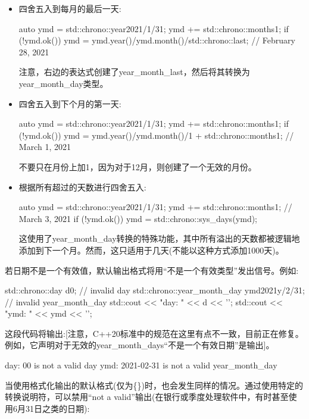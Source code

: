 \begin{itemize}
\item 
四舍五入到每月的最后一天:

\begin{cpp}
auto ymd = std::chrono::year{2021}/1/31;
ymd += std::chrono::months{1};
if (!ymd.ok()) {
	ymd = ymd.year()/ymd.month()/std::chrono::last; // February 28, 2021
}
\end{cpp}

注意，右边的表达式创建了year\_month\_last，然后将其转换为year\_month\_day类型。

\item 
四舍五入到下个月的第一天:

\begin{cpp}
auto ymd = std::chrono::year{2021}/1/31;
ymd += std::chrono::months{1};
if (!ymd.ok()) {
	ymd = ymd.year()/ymd.month()/1 + std::chrono::months{1}; // March 1, 2021
}
\end{cpp}

不要只在月份上加1，因为对于12月，则创建了一个无效的月份。

\item
根据所有超过的天数进行四舍五入:

\begin{cpp}
auto ymd = std::chrono::year{2021}/1/31;
ymd += std::chrono::months{1}; // March 3, 2021
if (!ymd.ok()) {
	ymd = std::chrono::sys_days(ymd);
}
\end{cpp}

这使用了year\_month\_day转换的特殊功能，其中所有溢出的天数都被逻辑地添加到下一个月。然而，这只适用于几天(不能以这种方式添加1000天)。
\end{itemize}

若日期不是一个有效值，默认输出格式将用“不是一个有效类型”发出信号。例如:

\begin{cpp}
std::chrono::day d{0}; // invalid day
std::chrono::year_month_day ymd{2021y/2/31}; // invalid year_month_day
std::cout << "day: " << d << '\n';
std::cout << "ymd: " << ymd << '\n';
\end{cpp}

这段代码将输出:[注意，C++20标准中的规范在这里有点不一致，目前正在修复。例如，它声明对于无效的year\_month\_days“不是一个有效日期”是输出]。

\begin{shell}
day: 00 is not a valid day
ymd: 2021-02-31 is not a valid year_month_day
\end{shell}

当使用格式化输出的默认格式(仅为\{\})时，也会发生同样的情况。通过使用特定的转换说明符，可以禁用“not a valid”输出(在银行或季度处理软件中，有时甚至使用6月31日之类的日期):

